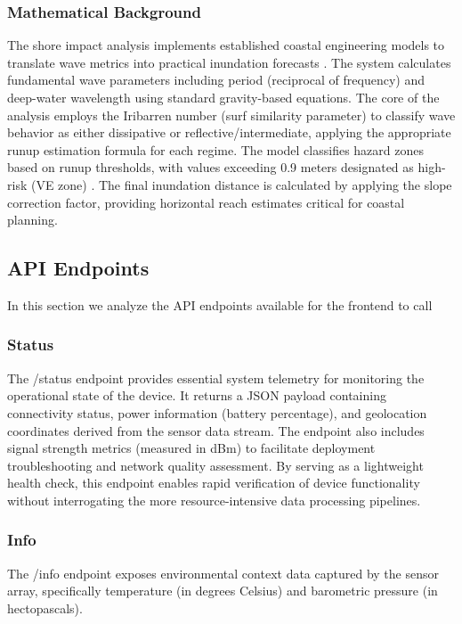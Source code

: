 \documentclass{article}
\begin{document}
    \subsubsection{Mathematical Background}
    The shore impact analysis implements established coastal engineering models to translate wave metrics into practical inundation forecasts \cite{stockdon2006}. The system calculates fundamental wave parameters including period (reciprocal of frequency) and deep-water wavelength using standard gravity-based equations. The core of the analysis employs the Iribarren number (surf similarity parameter) to classify wave behavior as either dissipative or reflective/intermediate, applying the appropriate runup estimation formula for each regime. The model classifies hazard zones based on runup thresholds, with values exceeding 0.9 meters designated as high-risk (VE zone) \cite{fema2022}. The final inundation distance is calculated by applying the slope correction factor, providing horizontal reach estimates critical for coastal planning.

\subsection{API Endpoints}
In this section we analyze the API endpoints available for the frontend to call

    \subsubsection{Status}
    The /status endpoint provides essential system telemetry for monitoring the operational state of the device. It returns a JSON payload containing connectivity status, power information (battery percentage), and geolocation coordinates derived from the sensor data stream. The endpoint also includes signal strength metrics (measured in dBm) to facilitate deployment troubleshooting and network quality assessment. By serving as a lightweight health check, this endpoint enables rapid verification of device functionality without interrogating the more resource-intensive data processing pipelines.

    \subsubsection{Info}
    The /info endpoint exposes environmental context data captured by the sensor array, specifically temperature (in degrees Celsius) and barometric pressure (in hectopascals).
\end{document}
